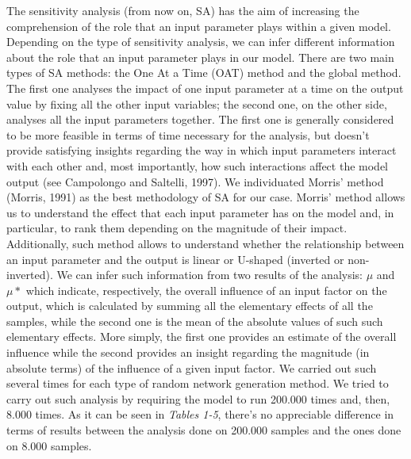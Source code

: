 \documentclass{article}
\begin{document}
The sensitivity analysis (from now on, SA) has the aim of increasing the comprehension of the role that an input parameter plays within a given model. Depending on the type of sensitivity analysis, we can infer different information about the role that an input parameter plays in our model. There are two main types of SA methods: the One At a Time (OAT) method and the global method. The first one analyses the impact of one input parameter at a time on the output value by fixing all the other input variables; the second one, on the other side, analyses all the input parameters together. The first one is generally considered to be more feasible in terms of time necessary for the analysis, but doesn’t provide satisfying insights regarding the way in which input parameters interact with each other and, most importantly, how such interactions affect the model output (see Campolongo and Saltelli, 1997).  
We individuated Morris’ method (Morris, 1991) as the best methodology of SA for our case. Morris’ method allows us to understand the effect that each input parameter has on the model and, in particular, to rank them depending on the magnitude of their impact. Additionally, such method allows to understand whether the relationship between an input parameter and the output is linear or U-shaped (inverted or non-inverted). We can infer such information from two results of the analysis: $\mu$ and $\mu*$ which indicate, respectively, the overall influence of an input factor on the output, which is calculated by summing all the elementary effects of all the samples, while the second one is the mean of the absolute values of such such elementary effects. More simply, the first one provides an estimate of the overall influence while the second provides an insight regarding the magnitude (in absolute terms) of the influence of a given input factor. 
We carried out such several times for each type of random network generation method. We tried to carry out such analysis by requiring the model to run 200.000 times and, then, 8.000 times. As it can be seen in \emph{Tables 1-5}, there's no appreciable difference in terms of results between the analysis done on 200.000 samples and the ones done on 8.000 samples. 
\end{document}
